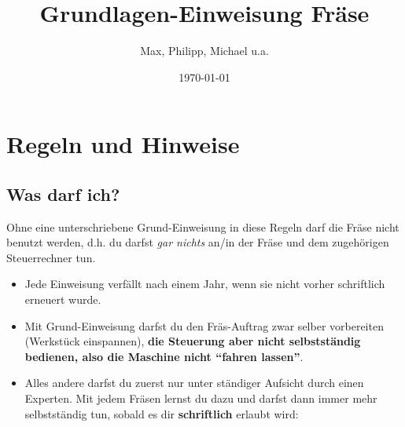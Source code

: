 \documentclass{\basedir/fablab-document}
\date{\today}
\author{Max, Philipp, Michael u.a.}
\title{Grundlagen-Einweisung Fräse}
\begin{document}
\maketitle
\section{Regeln und Hinweise}\label{regeln}
\subsection{Was darf ich?}
Ohne eine unterschriebene Grund-Einweisung in diese Regeln darf die Fräse nicht benutzt werden, d.h. du darfst \emph{gar nichts} an/in der Fräse und dem zugehörigen Steuerrechner tun.
\begin{itemize}
 \item Jede Einweisung verfällt nach einem Jahr, wenn sie nicht vorher schriftlich erneuert wurde. 
 \item Mit Grund-Einweisung darfst du den Fräs-Auftrag zwar selber vorbereiten (Werkstück einspannen), \textbf{die Steuerung aber nicht selbstständig bedienen, also die Maschine nicht \enquote{fahren lassen}}.
 \item Alles andere darfst du zuerst nur unter ständiger Aufsicht durch einen Experten. Mit jedem Fräsen lernst du dazu und darfst dann immer mehr selbstständig tun, sobald es dir \textbf{schriftlich} erlaubt wird:
\end{itemize}
\newenvironment{vorausliste}{\begin{list}{\textbullet}{\leftmargin=1em \labelwidth=0.6em \labelsep=0.4em \itemsep=2pt \parsep=0pt \topsep=2pt \partopsep=0pt}}{\end{list}}
\end{document}
